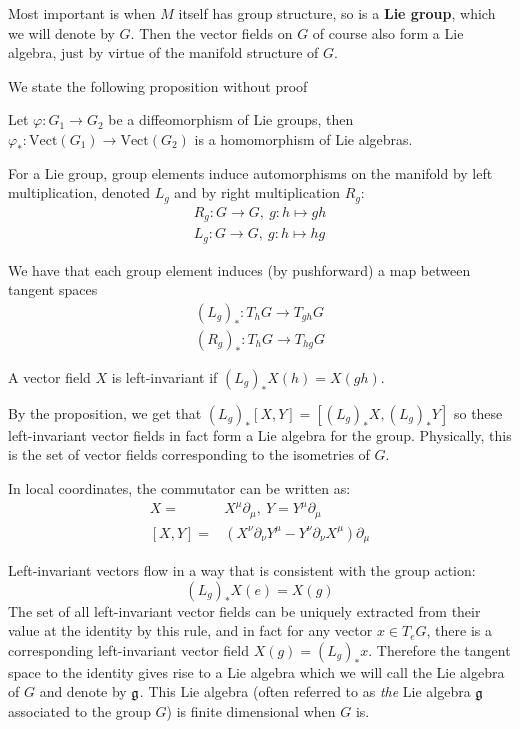		Most important is when $M$ itself has group structure, so is a \textbf{Lie group}, which we will denote by $G$. Then the vector fields on $G$ of course also form a Lie algebra, just by virtue of the manifold structure of $G$. 
		
		We state the following proposition without proof
		\begin{prop}
			Let $\varphi: G_1 \rightarrow G_2$ be a diffeomorphism of Lie groups, then $\varphi_*: \mathrm{Vect}(G_1) \rightarrow \mathrm{Vect}(G_2)$ is a homomorphism of Lie algebras. 
		\end{prop}
		
		For a Lie group, group elements induce automorphisms on the manifold by left multiplication, denoted $L_g$ and by right multiplication $R_g$:
		\begin{equation}
			\begin{aligned}
				R_g: G \rightarrow G, ~ g: h \mapsto gh\\
				L_g: G \rightarrow G, ~ g: h \mapsto hg
			\end{aligned}
		\end{equation}
		
		 We have that each group element induces (by pushforward) a map between tangent spaces 
		 \begin{equation}
		 	\begin{aligned}
		 		(L_g)_*: T_h G \rightarrow T_{gh} G\\
				(R_g)_*: T_h G \rightarrow T_{hg} G
		 	\end{aligned}
		 \end{equation}
		
		A vector field $X$ is left-invariant if $(L_g)_* X(h) = X(gh)$. 
		
		
		By the proposition, we get that $(L_g)_* [X, Y] = [(L_g)_* X, (L_g)_* Y]$ so these left-invariant vector fields in fact form a Lie algebra for the group. Physically, this is the set of vector fields corresponding to the isometries of $G$.
		
		In local coordinates, the commutator can be written as:
		\begin{equation}
			\begin{aligned}
				X = &X^\mu \partial_\mu, ~ Y = Y^\mu \partial_\mu\\
				[X,Y] = &(X^\nu \partial_\nu Y^\mu - Y^\nu \partial_\nu X^\mu) \partial_\mu
			\end{aligned}
		\end{equation}
		
		Left-invariant vectors flow in a way that is consistent with the group action:
		\begin{equation}
			(L_g)_* X(e) = X(g)
		\end{equation}
		The set of all left-invariant vector fields can be uniquely extracted from their value at the identity by this rule, and in fact for any vector $x \in T_e G$, there is a corresponding left-invariant vector field $X(g) = (L_g)_* x$. Therefore the tangent space to the identity gives rise to a Lie algebra which we will call the Lie algebra of $G$ and denote by $\frak g$. This Lie algebra (often referred to as \emph{the} Lie algebra $\frak g$ associated to the group $G$) is finite dimensional when $G$ is.
		
